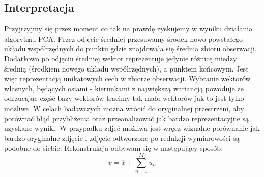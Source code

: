 \documentclass[oneside, eng]{mgr}
\begin{document}
\subsection{Interpretacja}
Przyjrzyjmy się przez moment co tak na prawdę zyskujemy w wyniku działania algorytmu PCA. Przez odjęcie średniej przesuwamy środek nowo powstałego układu współrzędnych do punktu gdzie znajdowała się średnia zbioru obserwacji. Dodatkowo po odjęciu średniej wektor reprezentuje jedynie różnicę miedzy średnią (środkiem nowego układu współrzędnych), a punktem końcowym. Jest więc reprezentacją unikatowych cech w zbiorze obserwacji. Wybranie wektorów własnych, będących osiami - kierunkami z największą wariancją powoduje że odrzucając część bazy wektorów tracimy tak mało wektorów jak to jest tylko możliwe. W celach badawczych można wrócić do oryginalnej przestrzeni, aby porównać błąd przybliżenia oraz przeanalizować jak bardzo reprezentacyjne są uzyskane wyniki. W przypadku zdjęć możliwa jest wręcz wizualne porównanie jak bardzo oryginalne zdjęcie i zdjęcie odtworzone po redukcji wymiarowości są podobne do siebie. Rekonstrukcja odbywam się w następujący sposób:
\begin{equation}
	v = \overline{x} + \sum_{n=1}^{M}u_n
\end{equation}
\end{document}

